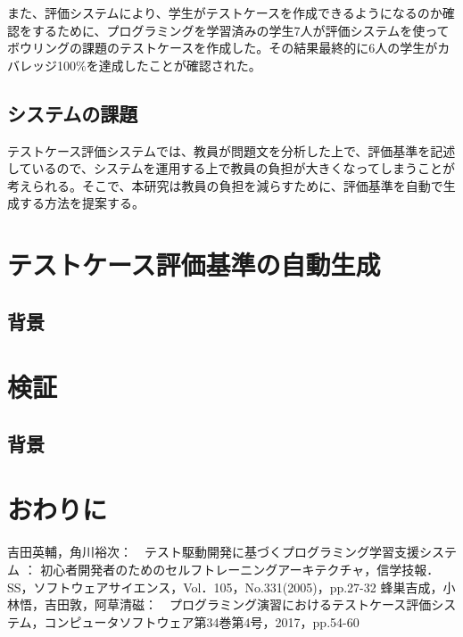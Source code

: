\documentclass{tpu-sotu}
\begin{document}
また、評価システムにより、学生がテストケースを作成できるようになるのか確認をするために、プログラミングを学習済みの学生7人が評価システムを使ってボウリングの課題のテストケースを作成した。その結果最終的に6人の学生がカバレッジ100\%を達成したことが確認された。
\section{システムの課題}
テストケース評価システムでは、教員が問題文を分析した上で、評価基準を記述しているので、システムを運用する上で教員の負担が大きくなってしまうことが考えられる。そこで、本研究は教員の負担を減らすために、評価基準を自動で生成する方法を提案する。
\chapter{テストケース評価基準の自動生成}
\section{背景}
\chapter{検証}
\section{背景}
\chapter{おわりに}
\acknowledgements
\begin{thebibliography}{2}
    吉田英輔，角川裕次：　テスト駆動開発に基づくプログラミング学習支援システム ： 初心者開発者のためのセルフトレーニングアーキテクチャ，信学技報．\\SS，ソフトウェアサイエンス，Vol．105，No.331(2005)，pp.27-32
    蜂巣吉成，小林悟，吉田敦，阿草清磁：　プログラミング演習におけるテストケース評価システム，コンピュータソフトウェア第34巻第4号，2017，pp.54-60
\end{thebibliography}
\end{document}
